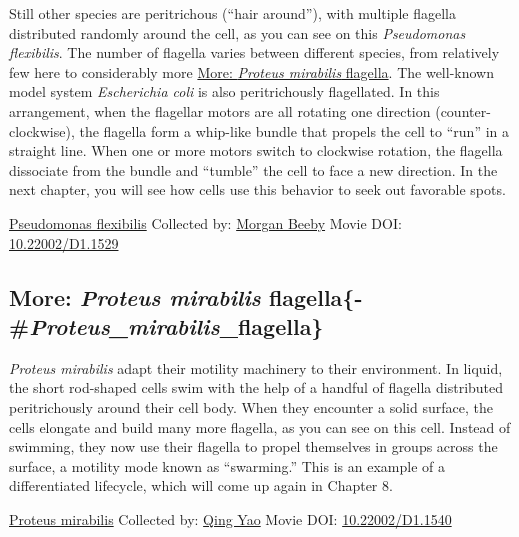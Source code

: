 \documentclass[]{tufte-book}
\begin{document}
Still other species are peritrichous (``hair around''), with multiple flagella distributed randomly around the cell, as you can see on this \emph{Pseudomonas flexibilis}. The number of flagella varies between different species, from relatively few here to considerably more \protect\hyperlink{ux2aProteus_mirabilisux2a_flagella}{More: \emph{Proteus mirabilis} flagella}. The well-known model system \emph{Escherichia coli} is also peritrichously flagellated. In this arrangement, when the flagellar motors are all rotating one direction (counter-clockwise), the flagella form a whip-like bundle that propels the cell to ``run'' in a straight line. When one or more motors switch to clockwise rotation, the flagella dissociate from the bundle and ``tumble'' the cell to face a new direction. In the next chapter, you will see how cells use this behavior to seek out favorable spots.



\hypertarget{htmlwidget-3c071ceb2239d728ed49}{}

\label{fig:6-5}\protect\hyperlink{tree}{Pseudomonas flexibilis} Collected by: \protect\hyperlink{morgan_beeby}{Morgan Beeby} Movie DOI: \href{https://doi.org/10.22002/D1.1529}{10.22002/D1.1529}

\hypertarget{more-proteus-mirabilis-flagella-proteus_mirabilis_flagella}{%
\subsection{\texorpdfstring{More: \emph{Proteus mirabilis} flagella\{-\#\emph{Proteus\_mirabilis}\_flagella\}}{More: Proteus mirabilis flagella\{-\#Proteus\_mirabilis\_flagella\}}}\label{more-proteus-mirabilis-flagella-proteus_mirabilis_flagella}}

\emph{Proteus mirabilis} adapt their motility machinery to their environment. In liquid, the short rod-shaped cells swim with the help of a handful of flagella distributed peritrichously around their cell body. When they encounter a solid surface, the cells elongate and build many more flagella, as you can see on this cell. Instead of swimming, they now use their flagella to propel themselves in groups across the surface, a motility mode known as ``swarming.'' This is an example of a differentiated lifecycle, which will come up again in Chapter 8.



\hypertarget{htmlwidget-f676075d11657bada2f4}{}

\label{fig:6-5a}\protect\hyperlink{tree}{Proteus mirabilis} Collected by: \protect\hyperlink{qing_yao}{Qing Yao} Movie DOI: \href{https://doi.org/10.22002/D1.1540}{10.22002/D1.1540}
\end{document}
